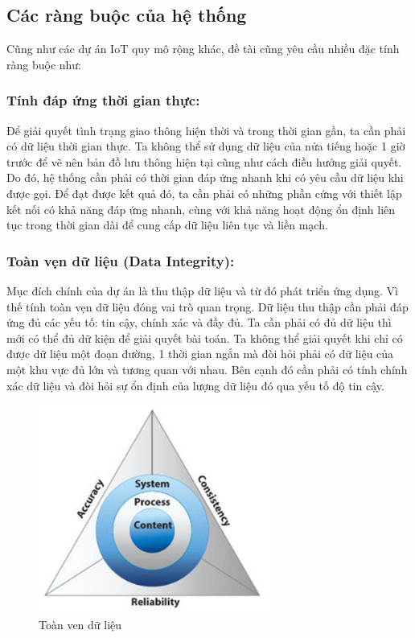 \subsection{Các ràng buộc của hệ thống}
Cũng như các dự án IoT quy mô rộng khác, đề tài cũng yêu cầu nhiều đặc tính ràng buộc như:  
\subsubsection*{Tính đáp ứng thời gian thực:}Để giải quyết tình trạng giao thông hiện thời và trong thời gian gần, ta cần phải có dữ liệu thời gian thực. Ta không thể sử dụng dữ liệu của nửa tiếng hoặc 1 giờ trước để vẽ nên bản đồ lưu thông hiện tại cũng như cách điều hướng giải quyết. Do đó, hệ thống cần phải có thời gian đáp ứng nhanh khi có yêu cầu dữ liệu khi được gọi. Để đạt được kết quả đó, ta cần phải có những phần cứng với thiết lập kết nối có khả năng đáp ứng nhanh, cùng với khả năng hoạt động ổn định liên tục trong thời gian dài để cung cấp dữ liệu liên tục và liền mạch.


\subsubsection*{Toàn vẹn dữ liệu (Data Integrity):} Mục đích chính của dự án là thu thập dữ liệu và từ đó phát triển ứng dụng. Vì thế tính toàn vẹn dữ liệu đóng vai trò quan trọng. Dữ liệu thu thập cần phải đáp ứng đủ các yếu tố: tin cậy, chính xác và đầy đủ. Ta cần phải có đủ dữ liệu thì mới có thể đủ dữ kiện để giải quyết bài toán. Ta không thể giải quyết khi chỉ có được dữ liệu một đoạn đường, 1 thời gian ngắn mà đòi hỏi phải có dữ liệu của một khu vực đủ lớn và tương quan với nhau. Bên cạnh đó cần phải có tính chính xác dữ liệu và đòi hỏi sự ổn định của lượng dữ liệu đó qua yếu tố độ tin cậy. 
\begin{center}
\begin{figure}[htp]
\centering    
\includegraphics[width=3in]{toanvendulieu}
\caption[Toàn ven dữ liệu]{Toàn ven dữ liệu}
\label{fig:toanvendulieu}
\end{figure}
\end{center}

